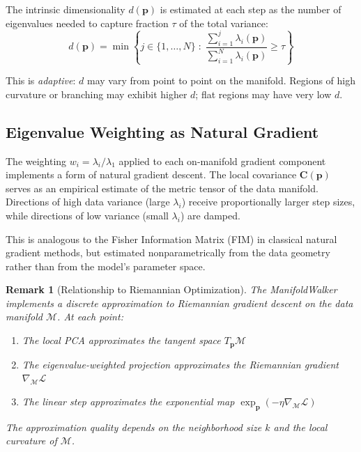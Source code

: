 \documentclass[11pt,letterpaper]{article}
\newtheorem{remark}{Remark}[section]
\newcommand{\pos}{\mathbf{p}}
\newcommand{\grad}{\nabla}
\newcommand{\manifold}{\mathcal{M}}
\newcommand{\tangent}{T}
\newcommand{\obj}{\mathcal{L}}
\newcommand{\cov}{\mathbf{C}}
\begin{document}
The intrinsic dimensionality $d(\pos)$ is estimated at each step as the
number of eigenvalues needed to capture fraction $\tau$ of the total
variance:
\begin{equation}
  d(\pos) = \min \left\{ j \in \{1, \ldots, N\} \;:\; \frac{\sum_{i=1}^{j} \lambda_i(\pos)}{\sum_{i=1}^{N} \lambda_i(\pos)} \geq \tau \right\}
\label{eq:dim}
\end{equation}

This is \emph{adaptive}: $d$ may vary from point to point on the manifold.
Regions of high curvature or branching may exhibit higher $d$; flat
regions may have very low $d$.

\subsection{Eigenvalue Weighting as Natural Gradient}

The weighting $w_i = \lambda_i / \lambda_1$ applied to each on-manifold
gradient component implements a form of natural gradient descent. The
local covariance $\cov(\pos)$ serves as an empirical estimate of the
metric tensor of the data manifold. Directions of high data variance
(large $\lambda_i$) receive proportionally larger step sizes, while
directions of low variance (small $\lambda_i$) are damped.

This is analogous to the Fisher Information Matrix (FIM) in classical
natural gradient methods, but estimated nonparametrically from the
data geometry rather than from the model's parameter space.

\begin{remark}[Relationship to Riemannian Optimization]
The ManifoldWalker implements a discrete approximation to Riemannian
gradient descent on the data manifold $\manifold$. At each point:
\begin{enumerate}[nosep]
  \item The local PCA approximates the tangent space $\tangent_\pos\manifold$
  \item The eigenvalue-weighted projection approximates the Riemannian gradient $\grad_{\manifold}\obj$
  \item The linear step approximates the exponential map $\exp_\pos(-\eta \grad_\manifold\obj)$
\end{enumerate}
The approximation quality depends on the neighborhood size $k$ and the
local curvature of $\manifold$.
\end{remark}

\end{document}
